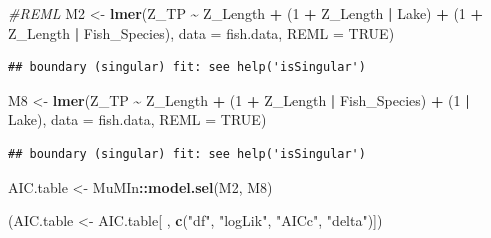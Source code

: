 \documentclass[
]{article}
\newenvironment{Shaded}{\begin{snugshade}}{\end{snugshade}}
\newcommand{\AttributeTok}[1]{\textcolor[rgb]{0.13,0.29,0.53}{#1}}
\newcommand{\CommentTok}[1]{\textcolor[rgb]{0.56,0.35,0.01}{\textit{#1}}}
\newcommand{\ConstantTok}[1]{\textcolor[rgb]{0.56,0.35,0.01}{#1}}
\newcommand{\DecValTok}[1]{\textcolor[rgb]{0.00,0.00,0.81}{#1}}
\newcommand{\FunctionTok}[1]{\textcolor[rgb]{0.13,0.29,0.53}{\textbf{#1}}}
\newcommand{\NormalTok}[1]{#1}
\newcommand{\OtherTok}[1]{\textcolor[rgb]{0.56,0.35,0.01}{#1}}
\newcommand{\SpecialCharTok}[1]{\textcolor[rgb]{0.81,0.36,0.00}{\textbf{#1}}}
\newcommand{\StringTok}[1]{\textcolor[rgb]{0.31,0.60,0.02}{#1}}
\begin{document}
\begin{Shaded}
\begin{Highlighting}[]
\CommentTok{\#REML}
\NormalTok{M2 }\OtherTok{\textless{}{-}} \FunctionTok{lmer}\NormalTok{(Z\_TP }\SpecialCharTok{\textasciitilde{}}\NormalTok{ Z\_Length }\SpecialCharTok{+}\NormalTok{ (}\DecValTok{1} \SpecialCharTok{+}\NormalTok{ Z\_Length }\SpecialCharTok{|}\NormalTok{ Lake) }\SpecialCharTok{+}\NormalTok{ (}\DecValTok{1} \SpecialCharTok{+}\NormalTok{ Z\_Length }\SpecialCharTok{|}\NormalTok{ Fish\_Species),}
     \AttributeTok{data =}\NormalTok{ fish.data, }\AttributeTok{REML =} \ConstantTok{TRUE}\NormalTok{)}
\end{Highlighting}
\end{Shaded}

\begin{verbatim}
## boundary (singular) fit: see help('isSingular')
\end{verbatim}

\begin{Shaded}
\begin{Highlighting}[]
\NormalTok{M8 }\OtherTok{\textless{}{-}} \FunctionTok{lmer}\NormalTok{(Z\_TP }\SpecialCharTok{\textasciitilde{}}\NormalTok{ Z\_Length }\SpecialCharTok{+}\NormalTok{ (}\DecValTok{1} \SpecialCharTok{+}\NormalTok{ Z\_Length }\SpecialCharTok{|}\NormalTok{ Fish\_Species) }\SpecialCharTok{+}\NormalTok{ (}\DecValTok{1} \SpecialCharTok{|}\NormalTok{ Lake),}
           \AttributeTok{data =}\NormalTok{ fish.data, }\AttributeTok{REML =} \ConstantTok{TRUE}\NormalTok{)}
\end{Highlighting}
\end{Shaded}

\begin{verbatim}
## boundary (singular) fit: see help('isSingular')
\end{verbatim}

\begin{Shaded}
\begin{Highlighting}[]
\NormalTok{AIC.table  }\OtherTok{\textless{}{-}}\NormalTok{ MuMIn}\SpecialCharTok{::}\FunctionTok{model.sel}\NormalTok{(M2, M8)}

\NormalTok{(AIC.table }\OtherTok{\textless{}{-}}\NormalTok{ AIC.table[ , }\FunctionTok{c}\NormalTok{(}\StringTok{"df"}\NormalTok{, }\StringTok{"logLik"}\NormalTok{, }\StringTok{"AICc"}\NormalTok{, }\StringTok{"delta"}\NormalTok{)])}
\end{Highlighting}
\end{Shaded}
\end{document}
